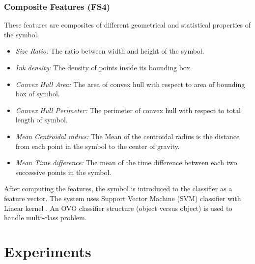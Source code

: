 \documentclass[preprint,1p,times,review]{elsarticle}
\begin{document}
\subsubsection{Composite Features (FS4)}
 These features are composites of different geometrical and statistical
 properties of the symbol.
	\begin{itemize}
\item \emph{Size Ratio:} The ratio between width and height of the symbol.
	\item \emph{Ink density:} The density of points inside its bounding
	box\cite{GeometryAndDomain102}.
 	\item \emph{Convex Hull Area:} The area of convex hull with respect to area of
 	bounding box of symbol.
	\item \emph{Convex Hull Perimeter:} The perimeter of convex hull with respect
	to total length of symbol.
		\item \emph{Mean Centroidal radius:} The Mean of the centroidal radius is the
		distance from each point in the symbol to the center of gravity.
	\item \emph{Mean Time difference:} The mean of the time difference between each
	two successive points in the symbol.
  \end{itemize}
  After computing the features, the symbol is introduced to the classifier as a feature vector. The system uses Support Vector Machine (SVM) classifier with Linear kernel \cite{libsvm}. An OVO classifier structure (object versus object) is used to handle multi-class problem.%

\section{Experiments}
\label{sec:Experiments}
\end{document}

